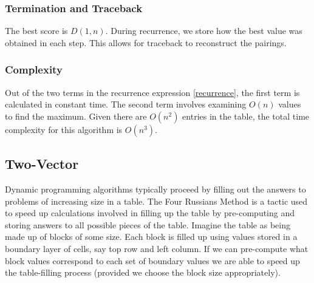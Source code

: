 \documentclass[journal]{IEEEtran}
\begin{document}
\subsubsection{ Termination and Traceback}

The best score is $D(1,n)$. During recurrence, we store how the best value was obtained in each step. This allows for traceback to reconstruct the pairings.

\subsubsection{Complexity}

    Out of the two terms in the recurrence expression \ref{recurrence}, the first term is calculated in constant time. The second term involves examining $O(n)$ values to find the maximum. Given there are $O(n^2)$ entries in the table, the total time complexity for this algorithm is $O(n^3)$.  


\subsection{Two-Vector}

Dynamic programming algorithms typically proceed by filling out the answers to problems of increasing size in a table. The Four Russians Method is a tactic used to speed up calculations involved in filling up the table by pre-computing and storing answers to all possible pieces of the table. Imagine the table as being made up of blocks of some size. Each block is filled up using values stored in a boundary layer of cells, say top row and left column. If we can pre-compute what block values correspond to each set of boundary values we are able to speed up the table-filling process (provided we choose the block size appropriately).
\end{document}
